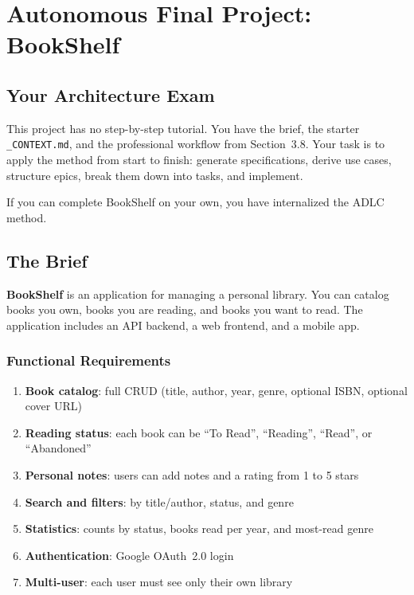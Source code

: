 \chapter{Autonomous Final Project: BookShelf}
\label{app:bookshelf}

\section*{Your Architecture Exam}

This project has no step-by-step tutorial. You have the brief, the starter \texttt{\_CONTEXT.md}, and the professional workflow from Section~3.8. Your task is to apply the method from start to finish: generate specifications, derive use cases, structure epics, break them down into tasks, and implement.

If you can complete BookShelf on your own, you have internalized the ADLC method.

\section{The Brief}

\textbf{BookShelf} is an application for managing a personal library. You can catalog books you own, books you are reading, and books you want to read. The application includes an API backend, a web frontend, and a mobile app.

\subsection{Functional Requirements}
\begin{enumerate}
  \item \textbf{Book catalog}: full CRUD (title, author, year, genre, optional ISBN, optional cover URL)
  \item \textbf{Reading status}: each book can be ``To Read'', ``Reading'', ``Read'', or ``Abandoned''
  \item \textbf{Personal notes}: users can add notes and a rating from 1 to 5 stars
  \item \textbf{Search and filters}: by title/author, status, and genre
  \item \textbf{Statistics}: counts by status, books read per year, and most-read genre
  \item \textbf{Authentication}: Google OAuth~2.0 login
  \item \textbf{Multi-user}: each user must see only their own library
\end{enumerate}

